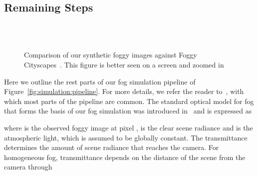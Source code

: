 \documentclass[twocolumn]{svjour3}          \smartqed  \usepackage{graphicx}
\begin{document}
\subsection{Remaining Steps}
\label{sec:simulation:rest}

\begin{figure*}[tb]
    \centering
    \hfil
    \hfil
    \\
    \hfil
    \hfil
    \\
    \addtocounter{subfigure}{-6}
    \hfil
    \hfil
    \caption{Comparison of our synthetic foggy images against Foggy Cityscapes~\cite{SFSU_synthetic}. This figure is better seen on a screen and zoomed in}
    \label{fig:fog:simulation}
\end{figure*}

Here we outline the rest parts of our fog simulation pipeline of Figure~\ref{fig:simulation:pipeline}. For more details, we refer the reader to~\cite{SFSU_synthetic}, with which most parts of the pipeline are common. The standard optical model for fog that forms the basis of our fog simulation was introduced in~\cite{Koschmieder:optical:model} and is expressed as

where  is the observed foggy image at pixel ,  is the clear scene radiance and  is the atmospheric light, which is assumed to be globally constant. The transmittance  determines the amount of scene radiance that reaches the camera. For homogeneous fog, transmittance depends on the distance  of the scene from the camera through
\end{document}
